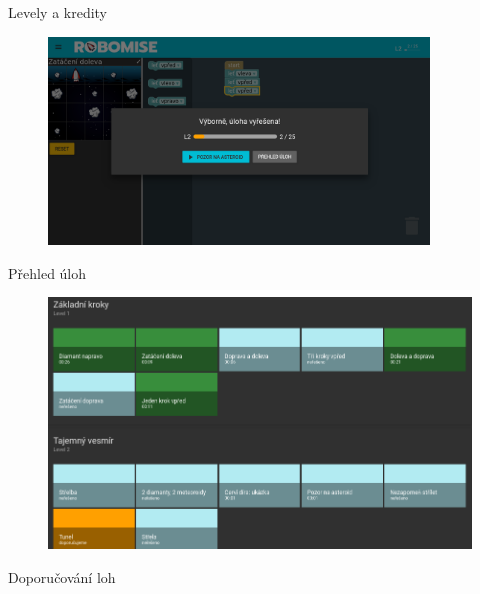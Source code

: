 \documentclass[
]{beamer}
\begin{document}
\begin{frame}{Levely a kredity}
\begin{figure}
\includegraphics[width=0.9\textwidth,height=.75\textheight,keepaspectratio]{../img/robomission-levels-credits}
\end{figure}
\end{frame}

\begin{frame}{Přehled úloh}
\begin{figure}
\includegraphics[width=\textwidth,height=.75\textheight,keepaspectratio]{../img/robomission-tasks-overview}
\end{figure}
\end{frame}

\begin{frame}{Doporučování loh}
\begin{figure}
\end{figure}
\end{frame}
\end{document}
